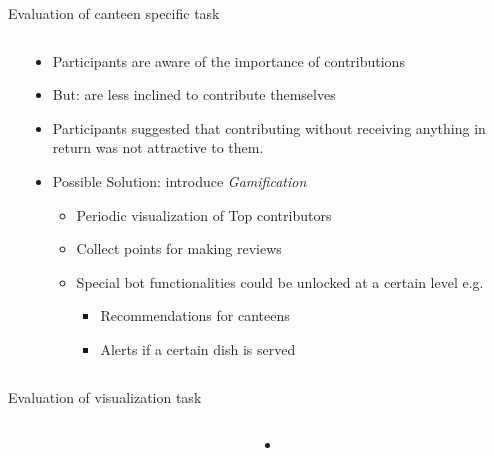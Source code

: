 \begin{frame}{Evaluation of canteen specific task}
  \begin{columns}
    \begin{column}[t]{0.5\textwidth}
      
    \end{column}
    \begin{column}[t]{0.5\textwidth}
      \begin{itemize}
        \item Participants are aware of the importance of contributions
        \item But: are less inclined to contribute themselves
       \item Participants suggested that contributing without receiving anything in return was not attractive to them.
        \item Possible Solution: introduce \emph{Gamification}
        \begin{itemize}
          \item Periodic visualization of Top contributors 
          \item Collect points for making reviews
          \item Special bot functionalities could be unlocked at a certain level e.g.
          \begin{itemize}
            \item Recommendations for canteens
            \item Alerts if a certain dish is served
          \end{itemize} 
        \end{itemize}
      \end{itemize}
    \end{column}
  \end{columns}
\end{frame}

\begin{frame}{Evaluation of visualization task}
  \begin{columns}
    \begin{column}[t]{0.5\textwidth}
      
    \end{column}
    \begin{column}[t]{0.5\textwidth}
      \begin{itemize}
        \item 
      \end{itemize}
    \end{column}
  \end{columns}
\end{frame}


